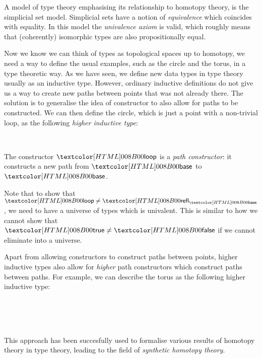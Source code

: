 A model of type theory emphasising its relationship to homotopy
theory, is the simplicial set model. Simplicial sets have a notion of
\emph{equivalence} which coincides with equality. In this model the
\emph{univalence axiom} is valid, which roughly means that
(coherently) isomorphic types are also propositionally equal.

Now we know we can think of types as topological spaces up to
homotopy, we need a way to define the usual examples, such as the
circle and the torus, in a type theoretic way. As we have seen, we
define new data types in type theory usually as an inductive
type. However, ordinary inductive definitions do not give us a way to
create new paths between points that was not already there. The
solution is to generalise the idea of constructor to also allow for
paths to be constructed. We can then define the circle, which is just
a point with a non-trivial loop, as the following \emph{higher
  inductive type}:
\begin{datatype}{\circlety}{\Type}
  \constr{\circlebase}{\circlety} \\
  \constr{\circleloop}{\circlebase = \circlebase}
\end{datatype}
The constructor $\circleloop$ is a \emph{path constructor}: it
constructs a new path from $\circlebase$ to $\circlebase$. 


Note that to show that $\circleloop \neq \refl_{\circlebase}$, we need
to have a universe of types which is univalent. This is similar to how
we cannot show that $\boolt \neq \boolf$ if we cannot eliminate into a
universe.

Apart from allowing constructors to construct paths between points,
higher inductive types also allow for \emph{higher} path constructors
which construct paths between paths. For example, we can describe the
torus as the following higher inductive type:
\begin{datatype}{\torusty}{\Type}
  \constr{\torusbase}{\torusty} \\
  \constr{\torusp}{\torusbase = \torusbase} \\
  \constr{\torusq}{\torusbase = \torusbase} \\
  \constr{\torusr}{\torusp \ct \torusq = \torusq \ct \torusp}
\end{datatype}

This approach has been succesfully used to formalise various results
of homotopy theory in type theory, leading to the field of
\emph{synthetic homotopy theory}.

